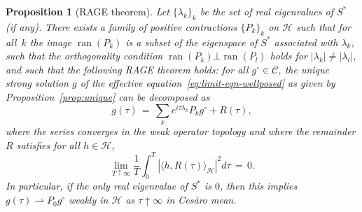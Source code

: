 \documentclass[a4paper,11pt,reqno,noindent]{amsart}
\theoremstyle{plain}
\newtheorem{prop}[lem]{Proposition}
\numberwithin{equation}{section}
\newcommand{\Cc}{\mathcal C}
\newcommand{\Hc}{\mathcal H}
\newcommand{\3}{|\!|\!|}
\newcommand{\cvf}{\rightharpoonup}
\begin{document}
\begin{prop}[RAGE theorem]\label{th:RAGE}
Let $\{\lambda_k\}_k$ be the set of real eigenvalues of $S^*$ (if any). There exists a family of positive contractions $\{P_k\}_k$ on $\Hc$ such that for all~$k$ the image $\operatorname{ran}(P_k)$ is a subset of the eigenspace of $S^*$ associated with $\lambda_k$, such that the orthogonality condition $\operatorname{ran}(P_k)\bot\operatorname{ran}(P_l)$ holds for $|\lambda_k|\ne|\lambda_l|$, and such that the following RAGE theorem holds: for all $g^\circ\in\Cc$, the unique strong solution $g$ of the effective equation~\eqref{eq:limit-eqn-wellposed} as given by Proposition~\ref{prop:unique} can be decomposed as
\[g(\tau)\,=\,\sum_ke^{i\tau\lambda_k}P_kg^\circ+R(\tau),\]
where the series converges in the weak operator topology and where the remainder $R$ satisfies for all $h\in\Hc$,
\[\lim_{T\uparrow\infty}\frac1T\int_0^T|\langle h,R(\tau)\rangle_\Hc|^2d\tau\,=\,0.\]
{In particular, if the only real eigenvalue of $S^*$ is $0$, then this implies $g(\tau)\cvf P_0g^\circ$ weakly in $\Hc$ as $\tau\uparrow\infty$ in Ces\`aro mean.}
\end{prop}
\end{document}
